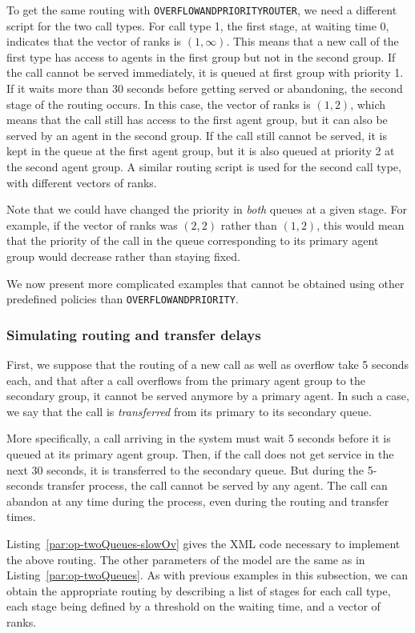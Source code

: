 To get the same routing with \texttt{OVERFLOWANDPRIORITYROUTER},
we need a different script for the two call types.
For call type 1, the first stage, at waiting time 0, indicates that
the vector of ranks is $(1, \infty)$.  This means that a new call of
the first type has access to agents in the first group but not in the
second group. If the call cannot be served immediately, it is queued
at first group with priority 1.
If it waits more than 30 seconds before getting served or abandoning,
the second stage of the routing occurs.
In this case, the vector of ranks is $(1, 2)$, which means that the
call still has access to the first agent group, but it can also be
served by an agent in the second group.
If the call still cannot be served, it is kept in the queue at the
first agent group, but it is also queued at priority 2 at the second
agent group.
A similar routing script is used for the second call type, with
different vectors of ranks.

Note that we could have changed the priority in \emph{both} queues at a given
stage. For example, if the vector of ranks was $(2,2)$ rather than
$(1,2)$, this would mean that the priority of the call in the queue
corresponding to its primary agent group would decrease rather than
staying fixed.

We now present more complicated examples that cannot be obtained using
other predefined policies than \texttt{OVERFLOWANDPRIORITY}.

\subsubsection{Simulating routing and transfer delays}

First, we suppose that the routing of a new call as well as overflow
take 5 seconds each, and that after a call overflows from the
primary agent group to the secondary group, it cannot be served
anymore by a primary agent.  In such a case, we say that the call is
\emph{transferred} from its primary to its secondary queue.

More specifically, a call arriving in the system must wait 5
seconds before it is queued at its primary agent group.
Then, if the call does not get service in the next 30 seconds, it is
transferred to the secondary queue. But during the 5-seconds
transfer process, the call cannot be served by any agent.
The call can abandon at any time during the process, even during the
routing and transfer times.

Listing~\ref{par:op-twoQueues-slowOv} gives the XML code necessary to
implement the above routing.
The other parameters of the model are the same as
in Listing~\ref{par:op-twoQueues}.
As with previous examples in this subsection, we can obtain the
appropriate routing by describing a list of stages for each call type,
each stage being defined by a threshold on the waiting time, and a
vector of ranks.

